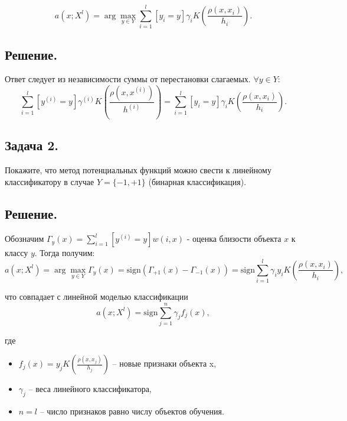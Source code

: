 \begin{equation*}
	\displaystyle a(x; X^l) = \arg\max_{y\in Y} \sum\limits_{i=1}^l[y_i=y]\gamma_i K\left(\frac{\rho(x, x_i)}{h_i}\right).
\end{equation*}

\subsection*{Решение.}

Ответ следует из независимости суммы от перестановки слагаемых. $\forall y \in Y$:
\begin{equation*}
	\displaystyle 
	\sum\limits_{i=1}^l[y^{(i)}=y]\gamma^{(i)} K\left(\frac{\rho(x, x^{(i)})}{h^{(i)}}\right)
	= \sum\limits_{i=1}^l[y_i=y]\gamma_i K\left(\frac{\rho(x, x_i)}{h_i}\right).
\end{equation*}


\subsection*{Задача 2.}

Покажите, что метод потенциальных функций можно свести к линейному классификатору в случае $Y=\{-1, +1\}$ (бинарная классификация).

\subsection*{Решение.}

Обозначим $\Gamma_y(x) = \sum\limits_{i=1}^l[y^{(i)}=y]w(i,x)$ - оценка близости объекта $x$ к классу $y$. Тогда получим:
\begin{equation*}
	\displaystyle a(x; X^l) = \arg\max_{y\in Y} \Gamma_y(x) = \text{sign} \left(\Gamma_{+1}(x) - \Gamma_{-1}(x)\right) =  \text{sign} \sum\limits_{i=1}^l \gamma_i y_i K\left(\frac{\rho(x, x_i)}{h_i}\right),
\end{equation*}

что совпадает с линейной моделью классификации 
\begin{equation*}
	\displaystyle a(x; X^l) = \text{sign} \sum\limits_{j=1}^n \gamma_j f_j(x),
\end{equation*}

где

\begin{itemize}
	\item $f_j(x) = y_j K\left(\frac{\rho(x, x_j)}{h_j}\right)$ -- новые признаки объекта x,
	\item $\gamma_j$ -- веса линейного классификатора, 
	\item $n = l$ -- число признаков равно числу объектов обучения.
\end{itemize}

